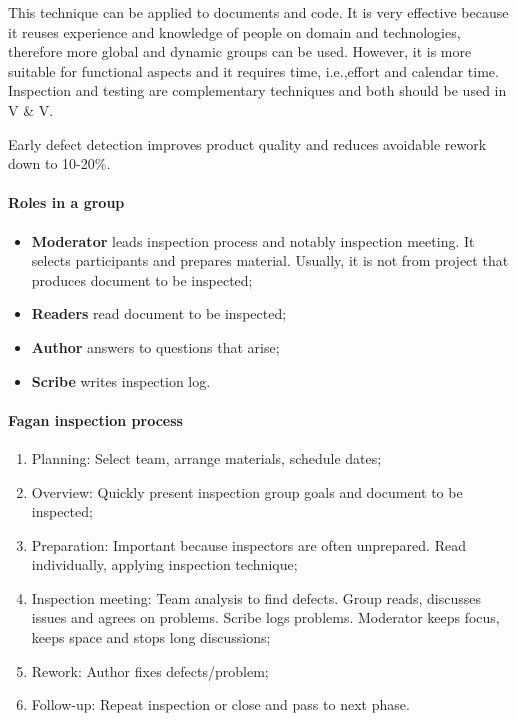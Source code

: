 This technique can be applied to documents and code. It is very effective because it reuses experience and knowledge of people on domain and technologies, therefore more global and dynamic groups can be used. However, it is more suitable for functional aspects and it requires time, i.e.,\@ effort and calendar time. Inspection and testing are complementary techniques and both should be used in V \& V.

Early defect detection improves product quality and reduces avoidable rework down to 10-20\%.

\paragraph{Roles in a group}
\begin{itemize}
\item \textbf{Moderator} leads inspection process and notably inspection meeting. It selects participants and prepares material. Usually, it is not from project that produces document to be inspected;
\item \textbf{Readers} read document to be inspected;
\item \textbf{Author} answers to questions that arise;
\item \textbf{Scribe} writes inspection log.
\end{itemize}

\paragraph{Fagan inspection process}
\begin{enumerate}
\item Planning: Select team, arrange materials, schedule dates;
\item Overview: Quickly present inspection group goals and document to be inspected;
\item Preparation: Important because inspectors are often unprepared. Read individually, applying inspection technique;
\item Inspection meeting: Team analysis to find defects. Group reads, discusses issues and agrees on problems. Scribe logs problems. Moderator keeps focus, keeps space and stops long discussions;
\item Rework: Author fixes defects/problem;
\item Follow-up: Repeat inspection or close and pass to next phase.
\end{enumerate}

